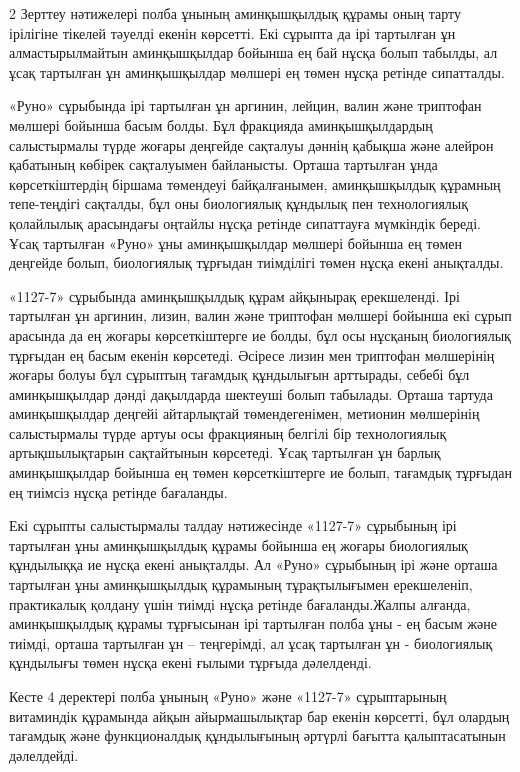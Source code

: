 \begin{multicols}{2}
Зерттеу нәтижелері полба ұнының аминқышқылдық құрамы оның тарту
ірілігіне тікелей тәуелді екенін көрсетті. Екі сұрыпта да ірі тартылған
ұн алмастырылмайтын аминқышқылдар бойынша ең бай нұсқа болып табылды, ал
ұсақ тартылған ұн аминқышқылдар мөлшері ең төмен нұсқа ретінде
сипатталды.

«Руно» сұрыбында ірі тартылған ұн аргинин, лейцин, валин және триптофан
мөлшері бойынша басым болды. Бұл фракцияда аминқышқылдардың салыстырмалы
түрде жоғары деңгейде сақталуы дәннің қабықша және алейрон қабатының
көбірек сақталуымен байланысты. Орташа тартылған ұнда көрсеткіштердің
біршама төмендеуі байқалғанымен, аминқышқылдық құрамның тепе-теңдігі
сақталды, бұл оны биологиялық құндылық пен технологиялық қолайлылық
арасындағы оңтайлы нұсқа ретінде сипаттауға мүмкіндік береді. Ұсақ
тартылған «Руно» ұны аминқышқылдар мөлшері бойынша ең төмен деңгейде
болып, биологиялық тұрғыдан тиімділігі төмен нұсқа екені анықталды.

«1127-7» сұрыбында аминқышқылдық құрам айқынырақ ерекшеленді. Ірі
тартылған ұн аргинин, лизин, валин және триптофан мөлшері бойынша екі
сұрып арасында да ең жоғары көрсеткіштерге ие болды, бұл осы нұсқаның
биологиялық тұрғыдан ең басым екенін көрсетеді. Әсіресе лизин мен
триптофан мөлшерінің жоғары болуы бұл сұрыптың тағамдық құндылығын
арттырады, себебі бұл аминқышқылдар дәнді дақылдарда шектеуші болып
табылады. Орташа тартуда аминқышқылдар деңгейі айтарлықтай
төмендегенімен, метионин мөлшерінің салыстырмалы түрде артуы осы
фракцияның белгілі бір технологиялық артықшылықтарын сақтайтынын
көрсетеді. Ұсақ тартылған ұн барлық аминқышқылдар бойынша ең төмен
көрсеткіштерге ие болып, тағамдық тұрғыдан ең тиімсіз нұсқа ретінде
бағаланды.

Екі сұрыпты салыстырмалы талдау нәтижесінде «1127-7» сұрыбының ірі
тартылған ұны аминқышқылдық құрамы бойынша ең жоғары биологиялық
құндылыққа ие нұсқа екені анықталды. Ал «Руно» сұрыбының ірі және орташа
тартылған ұны аминқышқылдық құрамының тұрақтылығымен ерекшеленіп,
практикалық қолдану үшін тиімді нұсқа ретінде бағаланды.Жалпы алғанда,
аминқышқылдық құрамы тұрғысынан ірі тартылған полба ұны - ең басым және
тиімді, орташа тартылған ұн -- теңгерімді, ал ұсақ
тартылған ұн - биологиялық құндылығы төмен нұсқа екені ғылыми
тұрғыда дәлелденді.

Кесте 4 деректері полба ұнының «Руно» және «1127-7» сұрыптарының
витаминдік құрамында айқын айырмашылықтар бар екенін көрсетті, бұл
олардың тағамдық және функционалдық құндылығының әртүрлі бағытта
қалыптасатынын дәлелдейді.


\end{multicols}
